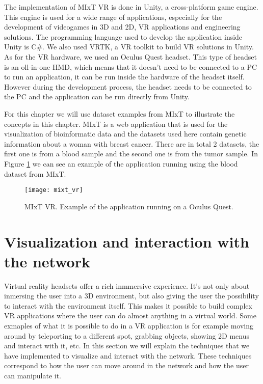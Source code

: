 The implementation of MIxT VR is done in Unity, a cross-platform game engine. This engine is used for a wide range of applications, especially for the development of videogames in 3D and 2D, VR applications and engineering solutions. The programming language used to develop the application inside Unity is C\#. We also used VRTK, a VR toolkit to build VR solutions in Unity. As for the VR hardware, we used an Oculus Quest headset. This type of headset is an oll-in-one HMD, which means that it doesn't need to be connected to a PC to run an application, it can be run inside the hardware of the headset itself. However during the development process, the headset needs to be connected to the PC and the application can be run directly from Unity.

For this chapter we will use dataset examples from MIxT to illustrate the concepts in this chapter. MIxT is a web application that is used for the visualization of bioinformatic data\cite{fjukstad_dumeaux_olsen_lund_hallett_bongo_2017}\cite{dumeaux_fjukstad_interactions_tumor_blood} and the datasets used here contain genetic information about a woman with breast cancer. There are in total 2 datasets, the first one is from a blood sample and the second one is from the tumor sample. In Figure \ref{fig:mixt_vr} we can see an example of the application running using the blood dataset from MIxT.

\begin{figure}[h!]
    \setlength{\tempheight}{15ex}
    \centering
    \texttt{[image: mixt\_vr]}
    \caption{MIxT VR. Example of the application running on a Oculus Quest.}
    \label{fig:mixt_vr}
\end{figure}

\section{Visualization and interaction with the network}
Virtual reality headsets offer a rich inmmersive experience. It's not only about inmersing the user into a 3D environment, but also giving the user the possibility to interact with the environment itself. This makes it possible to build complex VR applications where the user can do almost anything in a virtual world. Some exmaples of what it is possible to do in a VR application is for example moving around by teleporting to a different spot, grabbing objects, showing 2D menus and interact with it, etc. In this section we will explain the techniques that we have implemented to visualize and interact with the network. These techniques correspond to how the user can move around in the network and how the user can manipulate it.

